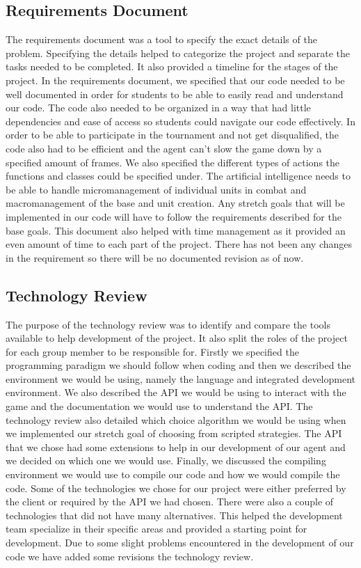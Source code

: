 \documentclass[10pt,letterpaper,onecolumn,draftclsnofoot]{IEEEtran}
\begin{document}
	\subsection{Requirements Document}
	The requirements document was a tool to specify the exact details of the problem. Specifying the details helped to categorize the project and separate the tasks needed to be completed. It also provided a timeline for the stages of the project. In the requirements document, we specified that our code needed to be well documented in order for students to be able to easily read and understand our code. The code also needed to be organized in a way that had little dependencies and ease of access so students could navigate our code effectively. In order to be able to participate in the tournament and not get disqualified, the code also had to be efficient and the agent can't slow the game down by a specified amount of frames. We also specified the different types of actions the functions and classes could be specified under. The artificial intelligence needs to be able to handle micromanagement of individual units in combat and macromanagement of the base and unit creation. Any stretch goals that will be implemented in our code will have to follow the requirements described for the base goals. This document also helped with time management as it provided an even amount of time to each part of the project. There has not been any changes in the requirement so there will be no documented revision as of now.

	\subsection{Technology Review}
	The purpose of the technology review was to identify and compare the tools available to help development of the project. It also split the roles of the project for each group member to be responsible for. Firstly we specified the programming paradigm we should follow when coding and then we described the environment we would be using, namely the language and integrated development environment. We also described the API we would be using to interact with the game and the documentation we would use to understand the API. The technology review also detailed which choice algorithm we would be using when we implemented our stretch goal of choosing from scripted strategies. The API that we chose had some extensions to help in our development of our agent and we decided on which one we would use. Finally, we discussed the compiling environment we would use to compile our code and how we would compile the code. Some of the technologies we chose for our project were either preferred by the client or required by the API we had chosen. There were also a couple of technologies that did not have many alternatives. This helped the development team specialize in their specific areas and provided a starting point for development. Due to some slight problems encountered in the development of our code we have added some revisions the technology review.
\end{document}
